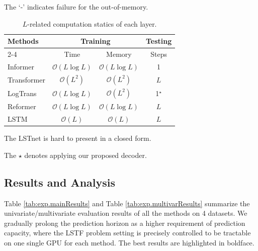 \documentclass[letterpaper]{article} %
\newcommand{\bigO}{\mathcal{O}}
\newcommand{\mn}{Informer}
\begin{document}
\begin{table}[t]
\begin{minipage}{0.58\linewidth}
\begin{threeparttable}[b]
\begin{tablenotes}
\item[2] The `-' indicates failure for the out-of-memory.
\end{tablenotes}
\caption{Ablation study of the \emph{ProbSparse} self-attention mechanism.}
\label{tab:exp.ablation.sparse}
\end{threeparttable}
\end{minipage}
\begin{minipage}{0.41\linewidth}
\centering
\fontsize{9pt}{9pt}\selectfont
\begin{threeparttable}
\begin{tabular}{l|c|c|c}
\toprule[1.0pt]
\multirow{3}{*}{Methods}  & \multicolumn{2}{c|}{Training} & Testing     \\
\cmidrule{2-4}
         & Time          & Memory  & Steps             \\
\midrule[1.0pt]
\mn   & $\bigO (L \log L)$   & $\bigO (L \log L)$ & 1                       \\
\midrule[0.5pt]
Transformer   & $\bigO (L^2)$   & $\bigO (L^2)$ & $L$                       \\
\midrule[0.5pt]
LogTrans & $\bigO (L \log L)$   & $\bigO (L^2)$ & 1$^{\star}$                      \\
\midrule[0.5pt]
Reformer & $\bigO (L \log L)$   & $\bigO (L \log L)$ & $L$          \\
\midrule[0.5pt]
LSTM     & $\bigO (L)$   & $\bigO (L)$ & $L$                     \\
\bottomrule[1.0pt]
\end{tabular}
\begin{tablenotes}
\item[1] The LSTnet is hard to present in a closed form.
\item[2] The ${\star}$ denotes applying our proposed decoder. 
\end{tablenotes}
\end{threeparttable}
\captionsetup{type=table} %
\caption{$L$-related computation statics of each layer.}
\label{tab:exp.computation.summary}
\end{minipage}
\end{table}

\subsection{Results and Analysis}
\label{sec:exp.overallresult}
Table \ref{tab:exp.mainResults} and Table \ref{tab:exp.multivarResults} summarize the univariate/multivariate evaluation results of all the methods on 4 datasets. We gradually prolong the prediction horizon as a higher requirement of prediction capacity, where the LSTF problem setting is precisely controlled to be tractable on one single GPU for each method.
The best results are highlighted in boldface.
\end{document}
